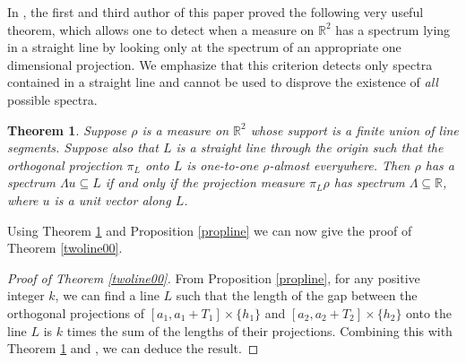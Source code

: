 \documentclass[12pt,a4paper,intlimits,sumlimits]{amsart}
\theoremstyle{plain}
\newtheorem{theorem}{Theorem}
\theoremstyle{definition}
\newcommand{\RR}{{\mathbb R}}
\newcounter{rem}
\begin{document}
In \cite[Theorem 1.2]{kolountzakis2025spectrality}, the first and third author of this paper  proved the following very useful theorem, which allows one to detect when a measure on 
$\RR^2$ has a spectrum lying in a straight line by looking only at the spectrum of an appropriate one dimensional projection. We emphasize that this criterion detects only spectra contained in a straight line and cannot be used to disprove the existence of \textit{all} possible spectra.

\begin{theorem}\cite[Theorem 1.2]{kolountzakis2025spectrality}\label{th:projections}
Suppose $\rho$ is a  measure on $\RR^2$ whose support is a finite union of line segments. Suppose also that $L$ is a straight line through the origin such that the orthogonal projection $\pi_L$ onto $L$ is one-to-one $\rho$-almost everywhere. Then $\rho$ has a spectrum $\Lambda u \subseteq L$ if and only if the projection measure $\pi_L\rho$ has spectrum $\Lambda \subseteq \RR$, where $u$ is a unit vector along $L$. 
\end{theorem}
Using Theorem \ref{th:projections} and Proposition \ref{propline} we can now give the proof of Theorem \ref{twoline00}.


\begin{proof}[Proof of Theorem \ref{twoline00}]  
 From Proposition \ref{propline}, for any positive integer $k$, we can find a line $L$ such that the length of the gap between the orthogonal projections of  $[a_1, a_1+T_1]\times\{h_1\}$ 
and  $[a_2, a_2+T_2]\times\{h_2\}$   onto the line 
 $L$ is $k$ times the sum of the lengths of their projections.
 Combining this with Theorem \ref{th:projections} and \cite[Theorem 1.1] {laba2001}, we can deduce the result.

\end{proof}
\end{document}
